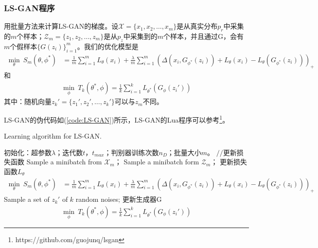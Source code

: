         \subsubsection{LS-GAN程序}
            \par
            用批量方法来计算LS-GAN的梯度。设$\mathcal{X} = \{x_1,x_2,\dots,x_m\}$是从真实分布$p_r$中采集的$m$个样本；$\mathcal{Z}_m = \{z_1,z_2,\dots,z_m\}$是从$p_z$中采集到的$m$个样本，并且通过G，会有$m$个假样本$\{G(z_i)\}_{i=1}^m$。我们的优化模型是
            \begin{align*}
            \min_\theta\ S_m (\theta,\phi^*) &= \frac{1}{m} \sum_{i=1}^m L_\theta(x_i) + \frac{\lambda}{m}\sum_{i=1}^m(\Delta(x_i,G_{\phi^*}(z_i))+L_\theta(x_i) - L_\theta(G_{\phi^*}(z_i)))_+
            \end{align*}
            和
            \begin{align*}
            \min_\phi \ T_k(\theta^*,\phi) = \frac{1}{k} \sum_{i=1}^k L_{\theta^*}(G_\phi(z_i'))
            \end{align*}
            其中：随机向量$z_k' = \{z_1',z_2',\dots,z_k'\}$可以与$z_m$不同。
            \par
            LS-GAN的伪代码如(\ref{code:LS-GAN})所示，LS-GAN的Lua程序可以参考\footnote{https://github.com/guojunq/lsgan}。
            \begin{algorithm}[htbp]
                \caption{Learning algorithm for LS-GAN.}\label{code:LS-GAN}
                \begin{algorithmic}[1]
                    \State 初始化：超参数$\lambda$；迭代数$t$，$t_{max}$；判别器训练次数$n_D$；批量大小$m$。
                            \State $//$更新损失函数
                            \State Sample a minibatch from $\mathcal{X}_m$；
                            \State Sample a minibatch form $\mathcal{Z}_m$；
                            \State 更新损失函数$L_\theta$
                            \begin{align*}
                            \min_\theta\ S_m (\theta,\phi^*) &= \frac{1}{m} \sum_{i=1}^m L_\theta(x_i) + \frac{\lambda}{m}\sum_{i=1}^m(\Delta(x_i,G_{\phi^*}(z_i))+L_\theta(x_i) - L_\theta(G_{\phi^*}(z_i)))_+
                            \end{align*}
                        \EndFor
                        \State Sample a set of $z_k'$ of $k$ random noises;
                        \State 更新生成器G
                        \begin{align*}
                        \min_\phi \ T_k(\theta^*,\phi) = \frac{1}{k} \sum_{i=1}^k L_{\theta^*}(G_\phi(z_i'))
                        \end{align*}
                    \EndFor
                \end{algorithmic}
            \end{algorithm}
